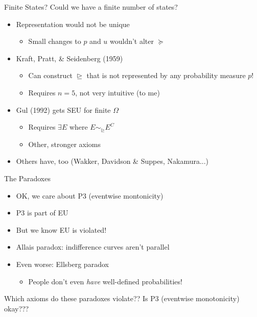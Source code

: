\begin{frame}{Finite States?}
Could we have a finite number of states?
\begin{itemize}
    \item Representation would not be unique
    \begin{itemize}
        \item Small changes to $p$ and $u$ wouldn't alter $\succeq$
    \end{itemize}
    \item Kraft, Pratt, \& Seidenberg (1959)
    \begin{itemize}
        \item Can construct $\trianglerighteq$ that is not represented by any probability measure $p$!
        \item Requires $n=5$, not very intuitive (to me)
    \end{itemize}
    \item Gul (1992) gets SEU for finite $\Omega$
    \begin{itemize}
        \item Requires $\exists E$ where $E\sim_\trianglerighteq E^C$
        \item Other, stronger axioms
    \end{itemize}
    \item Others have, too (Wakker, Davidson \& Suppes, Nakamura...)
\end{itemize}
    
\end{frame}

\begin{frame}{The Paradoxes}
\begin{itemize}
    \item OK, we care about P3 (eventwise montonicity)
    \item P3 is part of EU
    \item But we know EU is violated!
    \item Allais paradox: indifference curves aren't parallel
    \item Even worse: Ellsberg paradox
    \begin{itemize}
        \item People don't even \textit{have} well-defined probabilities!
    \end{itemize}
\end{itemize}
\br
Which axioms do these paradoxes violate??
\br
Is P3 (eventwise monotonicity) okay???
    
\end{frame}

